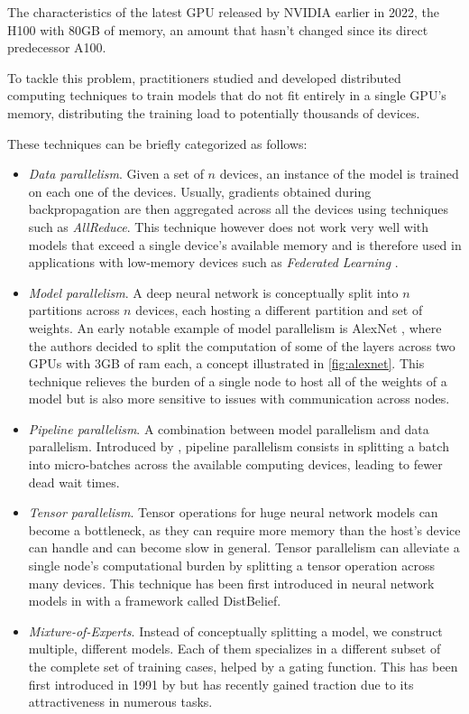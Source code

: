 The characteristics of the latest GPU released by NVIDIA earlier in 2022, the H100 with 80GB of memory, an amount that hasn't changed since its direct predecessor A100.

To tackle this problem, practitioners studied and developed distributed computing techniques to train models that do not fit entirely in a single GPU's memory, distributing the training load to potentially thousands of devices.

These techniques can be briefly categorized as follows:
\begin{itemize}
    \item \textit{Data parallelism}. Given a set of $n$ devices, an instance of the model is trained on each one of the devices. Usually, gradients obtained during backpropagation are then aggregated across all the devices using techniques such as \textit{AllReduce}. This technique however does not work very well with models that exceed a single device's available memory and is therefore used in applications with low-memory devices such as \textit{Federated Learning} \cite{li2019federatedlearning}.

    \item \textit{Model parallelism}. A deep neural network is conceptually split into $n$ partitions across $n$ devices, each hosting a different partition and set of weights. An early notable example of model parallelism is AlexNet \cite{alexnet2012}, where the authors decided to split the computation of some of the layers across two GPUs with 3GB of ram each, a concept illustrated in \autoref{fig:alexnet}. This technique relieves the burden of a single node to host all of the weights of a model but is also more sensitive to issues with communication across nodes.

    \item \textit{Pipeline parallelism}. A combination between model parallelism and data parallelism. Introduced by \cite{huang2018gpipe}, pipeline parallelism consists in splitting a batch into micro-batches across the available computing devices, leading to fewer dead wait times.
    \item \textit{Tensor parallelism}. Tensor operations for huge neural network models can become a bottleneck, as they can require more memory than the host's device can handle and can become slow in general. Tensor parallelism can alleviate a single node's computational burden by splitting a tensor operation across many devices. This technique has been first introduced in neural network models in \cite{dean2012distbelief} with a framework called DistBelief.
    \item \textit{Mixture-of-Experts}. Instead of conceptually splitting a model, we construct multiple, different models. Each of them specializes in a different subset of the complete set of training cases, helped by a gating function. This has been first introduced in 1991 by \cite{Jacobs1991mixtureofexperts} but has recently gained traction due to its attractiveness in numerous tasks.
\end{itemize}

